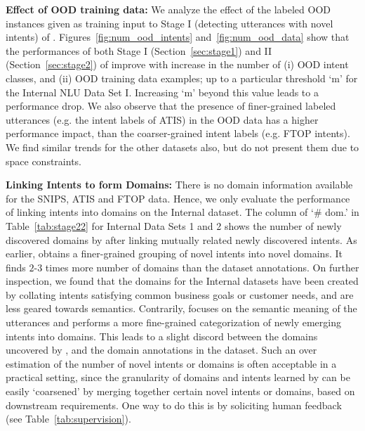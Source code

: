 
\smallskip

\noindent \textbf{Effect of OOD training data: }
We analyze the effect of the labeled OOD instances given as training input to Stage I (detecting utterances with novel intents) of \mname{}. Figures~\ref{fig:num_ood_intents} and~\ref{fig:num_ood_data} show that the performances of both Stage I (Section~\ref{sec:stage1}) and II (Section~\ref{sec:stage2}) of \mname{} improve with increase in the number of (i) OOD intent classes, and (ii) OOD training data examples; up to a particular threshold `m' for the Internal NLU Data Set I. Increasing `m' beyond this value leads to a performance drop. We also observe that the presence of finer-grained labeled utterances (e.g. the intent labels of ATIS) in the OOD data has a higher performance impact, than the coarser-grained intent labels (e.g. FTOP intents). 
We find similar trends for the other datasets also, but do not present them due to space constraints. 

\smallskip

\noindent \textbf{Linking Intents to form Domains: }
There is no domain information available for the SNIPS, ATIS and FTOP data. Hence, we only evaluate the performance of linking intents into domains on the Internal dataset. The column of `\# dom.' in Table~\ref{tab:stage22} for Internal Data Sets 1 and 2 shows the number of newly discovered domains by \mname{} after linking mutually related newly discovered intents. 
As earlier, \mname{} obtains a finer-grained grouping of novel intents into novel domains. It finds $2$-$3$ times more number of domains than the dataset annotations. On further inspection, we found that the domains for the Internal datasets have been created by collating intents satisfying common business goals or customer needs, and are less geared towards semantics. Contrarily, \mname{} focuses on the semantic meaning of the utterances and performs a more fine-grained categorization of newly emerging intents into domains. This leads to a slight discord between the domains uncovered by \mname{}, and the domain annotations in the dataset. Such an over estimation of the number of novel intents or domains 
is often acceptable in a practical setting, since the granularity of domains and intents learned by \mname{} can be easily `coarsened' by merging together certain novel intents or domains, 
based on downstream requirements. One way to do this is by soliciting human feedback %
(see Table~\ref{tab:supervision}). 

